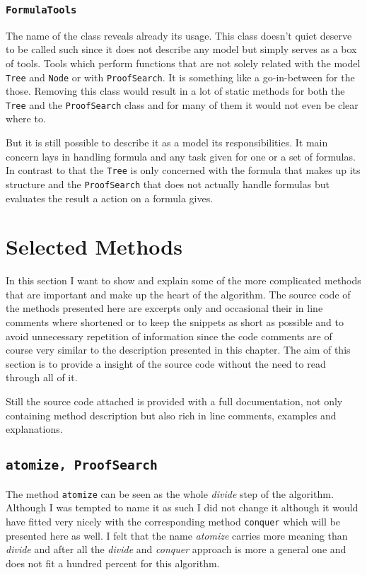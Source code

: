 \subsubsection[FormulaTools]{\texttt{FormulaTools}}
The name of the class reveals already its usage. This class doesn't quiet deserve to be called such since it does not describe any model but simply serves as a box of tools. Tools which perform functions that are not solely related with the model \texttt{Tree} and \texttt{Node} or with \texttt{ProofSearch}. It is something like a go-in-between for the those. Removing this class would result in a lot of static methods for both the \texttt{Tree} and the \texttt{ProofSearch} class and for many of them it would not even be clear where to. 

But it is still possible to describe it as a model its responsibilities. It main concern lays in handling formula and any task given for one or a set of formulas. In contrast to that the \texttt{Tree} is only concerned with the formula that makes up its structure and the \texttt{ProofSearch} that does not actually handle formulas but evaluates the result a action on a formula gives.


\section{Selected Methods}
In this section I want to show and explain some of the more complicated methods that are important and make up the heart of the algorithm. The source code of the methods presented here are excerpts only and occasional their in line comments where shortened or to keep the snippets as short as possible and to avoid unnecessary repetition of information since the code comments are of course very similar to the description presented in this chapter. The aim of this section is to provide a insight of the source code without the need to read through all of it. 

Still the source code attached is provided with a full documentation, not only containing method description but also rich in line comments, examples and explanations. 

\subsection[atomize]{\texttt{atomize, ProofSearch}}
The method \texttt{atomize} can be seen as the whole \emph{divide} step of the algorithm. Although I was tempted to name it as such I did not change it although it would have fitted very nicely with the corresponding method \texttt{conquer} which will be presented here as well. I felt that the name \emph{atomize} carries more meaning than \emph{divide} and after all the \emph{divide} and \emph{conquer} approach is more a general one and does not fit a hundred percent for this algorithm.

